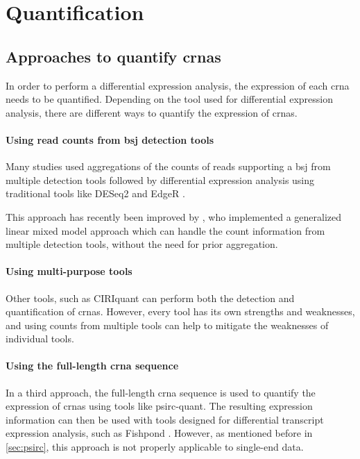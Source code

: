 \section{Quantification}

\subsection{Approaches to quantify \glspl{crna}}
In order to perform a differential expression analysis, the expression of each
\gls{crna} needs to be quantified.
Depending on the tool used for differential expression analysis, there are
different ways to quantify the expression of \glspl{crna}.

\paragraph{Using read counts from \gls{bsj} detection tools}
Many studies used aggregations of the counts of reads supporting a \gls{bsj}
from multiple detection tools followed by differential expression analysis
using traditional tools like DESeq2 and EdgeR
\supercite{digby_nf-corecircrna_2023,gaffo_sensitive_2022,love_moderated_2014,robinson_edger_2010}.

This approach has recently been improved by \textcite{buratin_detecting_2022},
who implemented a generalized linear mixed model approach which can handle the
count information from multiple detection tools, without the need for prior
aggregation\supercite{digby_computational_2024}.

\paragraph{Using multi-purpose tools}
Other tools, such as CIRIquant can perform both the detection and
quantification of \glspl{crna}\supercite{zhang_accurate_2020}.
However, every tool has its own strengths and weaknesses, and using counts from
multiple tools can help to mitigate the weaknesses of individual tools.

\paragraph{Using the full-length \gls{crna} sequence}
In a third approach, the full-length \gls{crna} sequence is used to quantify
the expression of \glspl{crna} using tools like
psirc-quant\supercite{yu_quantifying_2021}.
The resulting expression information can then be used with tools designed for
differential transcript expression analysis, such as Fishpond
\supercite{love_swimming_2018}.
However, as mentioned before in \cref{sec:psirc}, this approach is not properly
applicable to single-end data.

